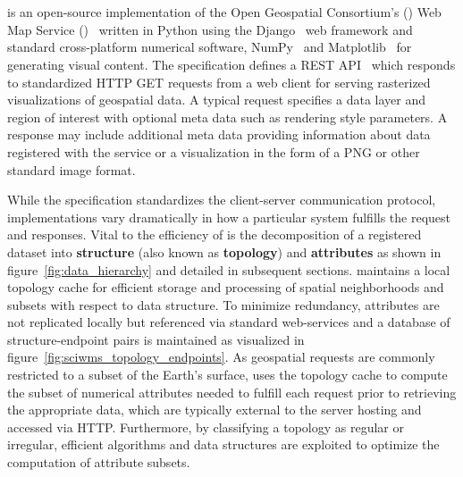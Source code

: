 \section{\sciwms{}}
\label{sec:sciwms}
\Sciwms{} is an open-source implementation of the Open Geospatial
Consortium's (\ogc{}) Web Map Service (\wms{})~\cite{wms14} written in
Python using the Django~\cite{django} web framework and standard
cross-platform numerical software, NumPy~\cite{numpy11} and
Matplotlib~\cite{hunter07} for generating visual content. The \wms{}
specification defines a REST API~\cite{Fielding02} which responds to
standardized HTTP GET requests from a web client for serving
rasterized visualizations of geospatial data. A typical \wms{} request
specifies a data layer and region of interest with optional meta data
such as rendering style parameters. A \wms{} response may include
additional meta data providing information about data registered with
the service or a visualization in the form of a PNG or other standard
image format.

While the \ogc{} \wms{} specification standardizes the client-server
communication protocol, \wms{} implementations vary dramatically in
how a particular system fulfills the \wms{} request and
responses. Vital to the efficiency of \sciwms{} is the decomposition
of a registered dataset into \textbf{structure} (also known as
\textbf{topology}) and \textbf{attributes} as shown in
figure~\ref{fig:data_hierarchy} and detailed in subsequent
sections. \Sciwms{} maintains a local topology cache for efficient
storage and processing of spatial neighborhoods and subsets with
respect to data structure. To minimize redundancy, attributes are not
replicated locally but referenced via standard web-services and a
database of structure-endpoint pairs is maintained as visualized in
figure~\ref{fig:sciwms_topology_endpoints}. As geospatial \wms{}
requests are commonly restricted to a subset of the Earth's surface,
\sciwms{} uses the topology cache to compute the subset of numerical
attributes needed to fulfill each request prior to retrieving the
appropriate data, which are typically external to the server hosting
\sciwms{} and accessed via HTTP. Furthermore, by classifying a
topology as regular or irregular, efficient algorithms and data
structures are exploited to optimize the computation of attribute
subsets.
